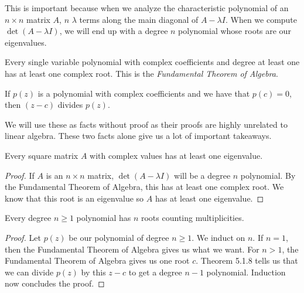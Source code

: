 This is important because when we analyze the characteristic polynomial of an $n\times n$ matrix $A$, $n$ $\lambda$ terms along the main diagonal of $A-\lambda I$. When we compute $\det(A-\lambda I)$, we will end up with a degree $n$ polynomial whose roots are our eigenvalues.
\begin{theorem}
    Every single variable polynomial with complex coefficients and degree at least one has at least one complex root. This is the \textit{Fundamental Theorem of Algebra}.
\end{theorem}
\begin{theorem}
    If $p(z)$ is a polynomial with complex coefficients and we have that $p(c)=0$, then $(z-c)$ divides $p(z)$.
\end{theorem}
We will use these as facts without proof as their proofs are highly unrelated to linear algebra. These two facts alone give us a lot of important takeaways.
\begin{corollary}
    Every square matrix $A$ with complex values has at least one eigenvalue.
\end{corollary}
\begin{proof}
    If $A$ is an $n\times n$ matrix, $\det(A-\lambda I)$ will be a degree $n$ polynomial. By the Fundamental Theorem of Algebra, this has at least one complex root. We know that this root is an eigenvalue so $A$ has at least one eigenvalue.
\end{proof}
\begin{corollary}
    Every degree $n\geq 1$ polynomial has $n$ roots counting multiplicities.
\end{corollary}
\begin{proof}
    Let $p(z)$ be our polynomial of degree $n\geq 1$. We induct on $n$. If $n=1$, then the Fundamental Theorem of Algebra gives us what we want. For $n>1$, the Fundamental Theorem of Algebra gives us one root $c$. Theorem 5.1.8 tells us that we can divide $p(z)$ by this $z-c$ to get a degree $n-1$ polynomial. Induction now concludes the proof.
\end{proof}
